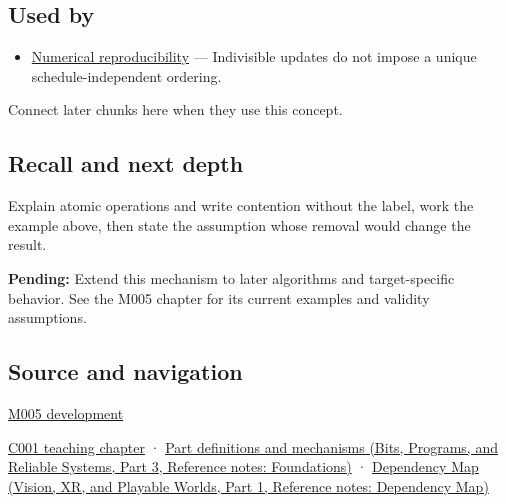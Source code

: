 \subsection{Used by}\label{appendix-e12d1b03fefb-used-by}

\hypertarget{appendix-e12d1b03fefb-used-by}{}

\begin{itemize}
\tightlist
\item
  \hyperref[appendix-5f1a2c3f97ff]{Numerical reproducibility} --- Indivisible updates do not impose a unique schedule-independent ordering.
\end{itemize}

Connect later chunks here when they use this concept.

\subsection{Recall and next depth}\label{appendix-e12d1b03fefb-recall-and-next-depth}

\hypertarget{appendix-e12d1b03fefb-recall-and-next-depth}{}

Explain atomic operations and write contention without the label, work the example above, then state the assumption whose removal would change the result.

\textbf{Pending:} Extend this mechanism to later algorithms and target-specific behavior. See the M005 chapter for its current examples and validity assumptions.

\subsection{Source and navigation}\label{appendix-e12d1b03fefb-source-and-navigation}

\hypertarget{appendix-e12d1b03fefb-source-and-navigation}{}

\hyperref[01-foundations-i-ch001-when-arithmetic-meets-uncertainty]{M005 development}

\hyperref[01-foundations-i-ch001-from-a-signal-to-an-interpretation]{C001 teaching chapter} · \href{../01-Bits-Programs-and-Reliable-Systems-P03/main.pdf\#appendix-fd090d982a15}{Part definitions and mechanisms (Bits, Programs, and Reliable Systems, Part 3, Reference notes: Foundations)} · \href{../07-Vision-XR-and-Playable-Worlds-P01/main.pdf\#appendix-4ad47bdd269a}{Dependency Map (Vision, XR, and Playable Worlds, Part 1, Reference notes: Dependency Map)}

